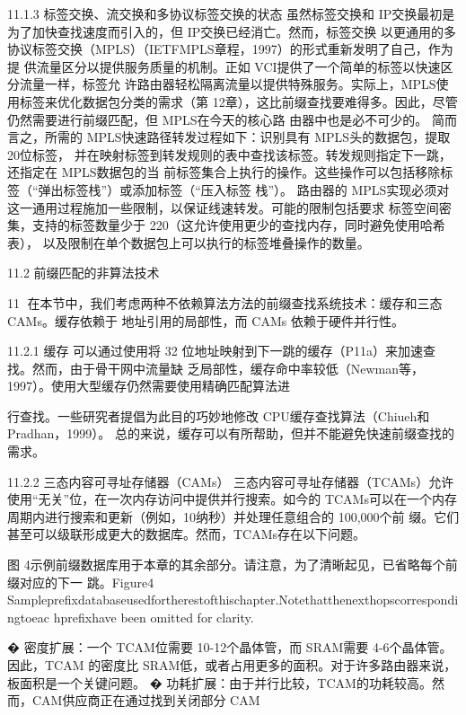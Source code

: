 11.1.3 标签交换、流交换和多协议标签交换的状态
虽然标签交换和 IP交换最初是为了加快查找速度而引入的，但 IP交换已经消亡。然而，标签交换
以更通用的多协议标签交换（MPLS）（IETFMPLS章程，1997）的形式重新发明了自己，作为提
供流量区分以提供服务质量的机制。正如 VCI提供了一个简单的标签以快速区分流量一样，标签允
许路由器轻松隔离流量以提供特殊服务。实际上，MPLS使用标签来优化数据包分类的需求（第
12章），这比前缀查找要难得多。因此，尽管仍然需要进行前缀匹配，但 MPLS在今天的核心路
由器中也是必不可少的。
简而言之，所需的 MPLS快速路径转发过程如下：识别具有 MPLS头的数据包，提取 20位标签，
并在映射标签到转发规则的表中查找该标签。转发规则指定下一跳，还指定在 MPLS数据包的当
前标签集合上执行的操作。这些操作可以包括移除标签（“弹出标签栈”）或添加标签（“压入标签
栈”）。
路由器的 MPLS实现必须对这一通用过程施加一些限制，以保证线速转发。可能的限制包括要求
标签空间密集，支持的标签数量少于 220（这允许使用更少的查找内存，同时避免使用哈希表），
以及限制在单个数据包上可以执行的标签堆叠操作的数量。



11.2 前缀匹配的非算法技术

                                                       11
在本节中，我们考虑两种不依赖算法方法的前缀查找系统技术：缓存和三态 CAMs。缓存依赖于
地址引用的局部性，而 CAMs 依赖于硬件并行性。

11.2.1 缓存
可以通过使用将 32 位地址映射到下一跳的缓存（P11a）来加速查找。然而，由于骨干网中流量缺
乏局部性，缓存命中率较低（Newman等，1997）。使用大型缓存仍然需要使用精确匹配算法进



行查找。一些研究者提倡为此目的巧妙地修改 CPU缓存查找算法（Chiueh和 Pradhan，1999）。
总的来说，缓存可以有所帮助，但并不能避免快速前缀查找的需求。

11.2.2 三态内容可寻址存储器（CAMs）
三态内容可寻址存储器（TCAMs）允许使用“无关”位，在一次内存访问中提供并行搜索。如今的
TCAMs可以在一个内存周期内进行搜索和更新（例如，10纳秒）并处理任意组合的 100,000个前
缀。它们甚至可以级联形成更大的数据库。然而，TCAMs存在以下问题。




图 4示例前缀数据库用于本章的其余部分。请注意，为了清晰起见，已省略每个前缀对应的下一
跳。Figure4
Sampleprefixdatabaseusedfortherestofthischapter.Notethatthenexthopscorrespondingtoeac
hprefixhave been omitted for clarity.

� 密度扩展：一个 TCAM位需要 10-12个晶体管，而 SRAM需要 4-6个晶体管。因此，TCAM
的密度比 SRAM低，或者占用更多的面积。对于许多路由器来说，板面积是一个关键问题。
� 功耗扩展：由于并行比较，TCAM的功耗较高。然而，CAM供应商正在通过找到关闭部分
CAM

